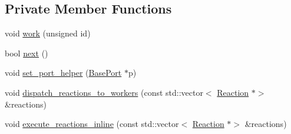 \subsection*{Private Member Functions}
\begin{DoxyCompactItemize}
\item 
void \hyperlink{classreactor_1_1Scheduler_a0ba1d794dc627f7927e5c0457f612960}{work} (unsigned id)
\item 
bool \hyperlink{classreactor_1_1Scheduler_ad1c1bbd55c9933b9e5886d378419185c}{next} ()
\item 
void \hyperlink{classreactor_1_1Scheduler_a09d04a0906b272908481b48ef12fc3f3}{set\+\_\+port\+\_\+helper} (\hyperlink{classreactor_1_1BasePort}{Base\+Port} $\ast$p)
\item 
void \hyperlink{classreactor_1_1Scheduler_a726e2f27cb5fc21f9b276a20e7f47192}{dispatch\+\_\+reactions\+\_\+to\+\_\+workers} (const std\+::vector$<$ \hyperlink{classreactor_1_1Reaction}{Reaction} $\ast$$>$ \&reactions)
\item 
void \hyperlink{classreactor_1_1Scheduler_a776074d94dcd54cc093c295b3359d5eb}{execute\+\_\+reactions\+\_\+inline} (const std\+::vector$<$ \hyperlink{classreactor_1_1Reaction}{Reaction} $\ast$$>$ \&reactions)
\end{DoxyCompactItemize}
